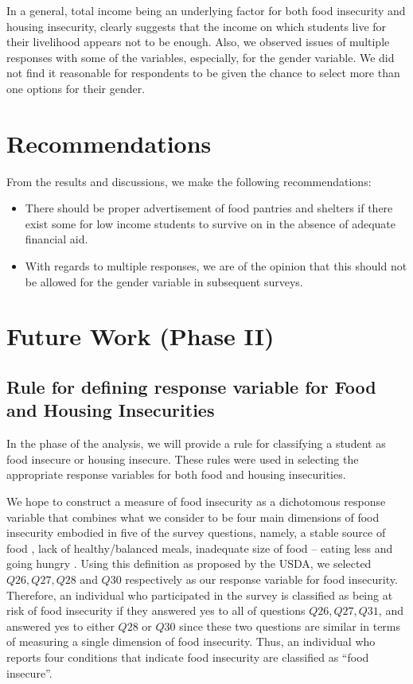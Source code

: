 \documentclass[
  10pt,
]{article}
\begin{document}
In a general, total income being an underlying factor for both food insecurity and housing insecurity, clearly suggests that the income on which students live for their livelihood appears not to be enough. Also, we observed issues of multiple responses with some of the variables, especially, for the gender variable. We did not find it reasonable for respondents to be given the chance to select more than one options for their gender.

\hypertarget{recommendations}{%
\section{Recommendations}\label{recommendations}}

From the results and discussions, we make the following recommendations:

\begin{itemize}
\item
  There should be proper advertisement of food pantries and shelters if there exist some for low income students to survive on in the absence of adequate financial aid.
\item
  With regards to multiple responses, we are of the opinion that this should not be allowed for the gender variable in subsequent surveys.
\end{itemize}

\hypertarget{future-work-phase-ii}{%
\section{Future Work (Phase II)}\label{future-work-phase-ii}}

\hypertarget{rule-for-defining-response-variable-for-food-and-housing-insecurities}{%
\subsection{Rule for defining response variable for Food and Housing Insecurities}\label{rule-for-defining-response-variable-for-food-and-housing-insecurities}}

In the phase of the analysis, we will provide a rule for classifying a student as food insecure or housing insecure. These rules were used in selecting the appropriate response variables for both food and housing insecurities.

We hope to construct a measure of food insecurity as a dichotomous response variable that combines what we consider to be four main dimensions of food insecurity embodied in five of the survey questions, namely, a stable source of food , lack of healthy/balanced meals, inadequate size of food -- eating less and going hungry . Using this definition as proposed by the USDA, we selected \(Q26, Q27, Q28\) and \(Q30\) respectively as our response variable for food insecurity. Therefore, an individual who participated in the survey is classified as being at risk of food insecurity if they answered yes to all of questions \(Q26, Q27, Q31\), and answered yes to either \(Q28\) or \(Q30\) since these two questions are similar in terms of measuring a single dimension of food insecurity. Thus, an individual who reports four conditions that indicate food insecurity are classified as ``food insecure''.
\end{document}
